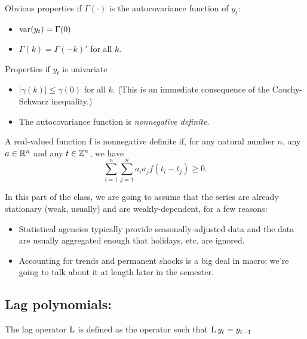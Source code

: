   Obvious properties if $\Gamma(\cdot)$ is the autocovariance function of
  $y_t$:
  \begin{itemize}
  \item $\operatorname{var}(y_t) = \Gamma(0)$
  \item $\Gamma(k) = \Gamma(-k)'$ for all $k$.
  \end{itemize}

  Properties if $y_t$ is univariate
  \begin{itemize}
  \item $|\gamma(k)| \leq \gamma(0)$ for all $k$. (This is an
    immediate consequence of the Cauchy-Schwarz inequality.)
  \item The autocovariance function is \emph{nonnegative definite}.
  \end{itemize}

  \begin{defn}
    A real-valued function f is nonnegative definite if, for any
    natural number $n$, any $a \in \mathbb{R}^n$ and any $t \in \mathbb{Z}^n$, we have
    \begin{equation*}
      \sum_{i=1}^n \sum_{j=1}^n a_i a_j f(t_i - t_j) \geq 0.
    \end{equation*}
  \end{defn}

In this part of the class, we are going to assume that the series are
already stationary (weak, usually) and are weakly-dependent, for a few reasons:
\begin{itemize}
\item Statistical agencies typically provide seasonally-adjusted data
  and the data are usually aggregated enough that holidays, etc. are
  ignored.
\item Accounting for trends and permanent shocks is a big deal in
  macro; we're going to talk about it at length later in the semester.
\end{itemize}

\subsection{Lag polynomials:}

\begin{defn}
  The lag operator $\operatorname{L}$ is defined as the operator such that
  $\operatorname{L} y_t = y_{t-1}$
\end{defn}

